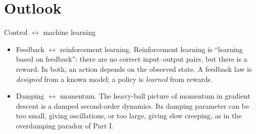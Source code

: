 \documentclass[10pt]{beamer}
\begin{document}
\section{Outlook}

\begin{frame}{Control $\leftrightarrow$ machine learning}
\footnotesize
\begin{itemize}
\item \alert{Feedback $\leftrightarrow$ reinforcement learning.} Reinforcement learning is ``learning based on feedback'': there are no correct input--output pairs, but there is a reward. In both, an action depends on the observed state. A feedback law is \emph{designed} from a known model; a policy is \emph{learned} from rewards.
\item \alert{Damping $\leftrightarrow$ momentum.} The heavy-ball picture of momentum in gradient descent is a damped second-order dynamics. Its damping parameter can be too small, giving oscillations, or too large, giving slow creeping, as in the overdamping paradox of Part I.
\end{itemize}
\end{frame}
\end{document}

